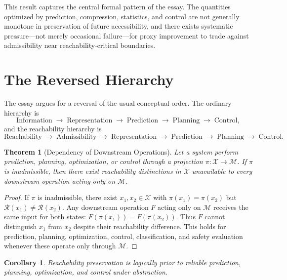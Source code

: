 \documentclass[12pt,a4paper]{article}
\theoremstyle{plain}
\newtheorem{theorem}{Theorem}
\newtheorem{corollary}{Corollary}
\theoremstyle{definition}
\theoremstyle{remark}
\begin{document}
This result captures the central formal pattern of the essay. The quantities
optimized by prediction, compression, statistics, and control are not generally
monotone in preservation of future accessibility, and there exists systematic
pressure---not merely occasional failure---for proxy improvement to trade
against admissibility near reachability-critical boundaries.

\section{The Reversed Hierarchy}

The essay argues for a reversal of the usual conceptual order. The ordinary
hierarchy is
\[
  \text{Information}
  \;\rightarrow\;
  \text{Representation}
  \;\rightarrow\;
  \text{Prediction}
  \;\rightarrow\;
  \text{Planning}
  \;\rightarrow\;
  \text{Control},
\]
and the reachability hierarchy is
\[
  \text{Reachability}
  \;\rightarrow\;
  \text{Admissibility}
  \;\rightarrow\;
  \text{Representation}
  \;\rightarrow\;
  \text{Prediction}
  \;\rightarrow\;
  \text{Planning}
  \;\rightarrow\;
  \text{Control}.
\]

\begin{theorem}[Dependency of Downstream Operations]
Let a system perform prediction, planning, optimization, or control through a
projection $\pi : \mathcal{X} \to \mathcal{M}$. If $\pi$ is inadmissible,
then there exist reachability distinctions in $\mathcal{X}$ unavailable to
every downstream operation acting only on $\mathcal{M}$.
\end{theorem}

\begin{proof}
If $\pi$ is inadmissible, there exist $x_1, x_2 \in \mathcal{X}$ with
$\pi(x_1) = \pi(x_2)$ but $\mathcal{R}(x_1) \neq \mathcal{R}(x_2)$. Any
downstream operation $F$ acting only on $\mathcal{M}$ receives the same input
for both states: $F(\pi(x_1)) = F(\pi(x_2))$. Thus $F$ cannot distinguish
$x_1$ from $x_2$ despite their reachability difference. This holds for
prediction, planning, optimization, control, classification, and safety
evaluation whenever these operate only through $\mathcal{M}$.
\end{proof}

\begin{corollary}
Reachability preservation is logically prior to reliable prediction, planning,
optimization, and control under abstraction.
\end{corollary}
\end{document}
